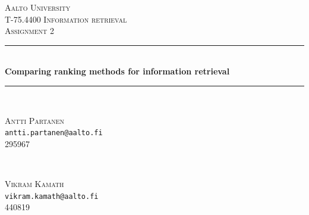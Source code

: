 \begin{titlepage}

\newcommand{\HRule}{\rule{\linewidth}{0.5mm}} %

\center %


\textsc{\LARGE Aalto University}\\[1.5cm] %
\textsc{\Large T-75.4400 Information retrieval}\\[0.5cm] %
\textsc{\large Assignment 2}\\[0.5cm] %


\HRule \\[0.4cm]
{ \huge \bfseries Comparing ranking methods for information retrieval}\\[0.4cm] %
\HRule \\[1.5cm]
 

\begin{minipage}{0.45\textwidth}
\begin{center} \large
\textsc{Antti Partanen}\\ %
\texttt{antti.partanen@aalto.fi}\\
295967
\end{center}
\end{minipage}
~
\begin{minipage}{0.45\textwidth}
\begin{center} \large
\textsc{Vikram Kamath}\\ %
\texttt{vikram.kamath@aalto.fi}\\
440819
\end{center}
\end{minipage}\\[2cm]



\end{titlepage}
